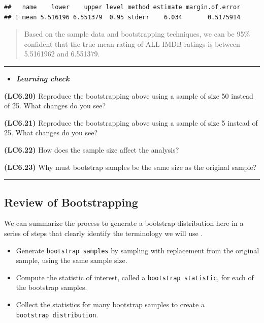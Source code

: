 \documentclass[]{tufte-book}
\let\oldrule=\rule
\renewcommand{\rule}[1]{\oldrule{\linewidth}}
\providecommand{\tightlist}{%
  \setlength{\itemsep}{0pt}\setlength{\parskip}{0pt}}
\newenvironment{rmdblock}[1]
  {\begin{shaded*}
  \begin{itemize}
  \renewcommand{\labelitemi}{
    \raisebox{-.7\height}[0pt][0pt]{
    }
  }
  \item
  }
  {
  \end{itemize}
  \end{shaded*}
  }
\newenvironment{learncheck}
  {\begin{rmdblock}{warning}}
  {\end{rmdblock}}
\begin{document}
\begin{verbatim}
##   name    lower    upper level method estimate margin.of.error
## 1 mean 5.516196 6.551379  0.95 stderr    6.034       0.5175914
\end{verbatim}

\begin{quote}
Based on the sample data and bootstrapping techniques, we can be 95\%
confident that the true mean rating of ALL IMDB ratings is between
5.5161962 and 6.551379.
\end{quote}

\begin{center}\rule{0.5\linewidth}{\linethickness}\end{center}

\begin{learncheck}
\textbf{\emph{Learning check}}
\end{learncheck}

\textbf{(LC6.20)} Reproduce the bootstrapping above using a sample of
size 50 instead of 25. What changes do you see?

\textbf{(LC6.21)} Reproduce the bootstrapping above using a sample of
size 5 instead of 25. What changes do you see?

\textbf{(LC6.22)} How does the sample size affect the analysis?

\textbf{(LC6.23)} Why must bootstrap samples be the same size as the
original sample?

\begin{center}\rule{0.5\linewidth}{\linethickness}\end{center}

\subsection{Review of Bootstrapping}\label{review-of-bootstrapping}

We can summarize the process to generate a bootstrap distribution here
in a series of steps that clearly identify the terminology we will use
\citep{lock2012}.

\begin{itemize}
\tightlist
\item
  Generate \texttt{bootstrap\ samples} by sampling with replacement from
  the original sample, using the same sample size.
\item
  Compute the statistic of interest, called a
  \texttt{bootstrap\ statistic}, for each of the bootstrap samples.
\item
  Collect the statistics for many bootstrap samples to create a
  \texttt{bootstrap\ distribution}.
\end{itemize}
\end{document}
